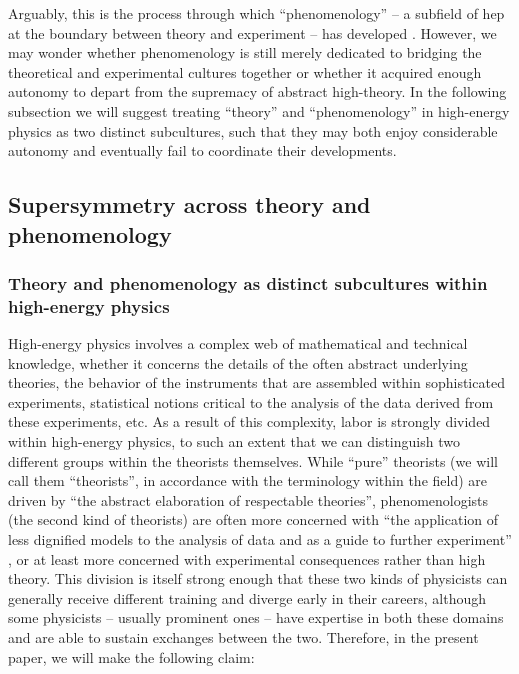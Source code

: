 \documentclass[smallextended]{svjour3}
\begin{document}
Arguably, this is the process through which ``phenomenology'' -- a subfield of \gls{hep} at the boundary between theory and experiment -- has developed \citep[p.~837]{galison1997image}. However, we may wonder whether phenomenology is still merely dedicated to bridging the theoretical and experimental cultures together or whether it acquired enough autonomy to depart from the supremacy of abstract high-theory. In the following subsection we will suggest treating ``theory'' and ``phenomenology'' in high-energy physics as two distinct subcultures, such that they may both enjoy considerable autonomy and eventually fail to coordinate their developments.

\subsection{Supersymmetry across theory and phenomenology}
\label{section:hep_susy}

\subsubsection{Theory and phenomenology as distinct subcultures within high-energy physics}

High-energy physics involves a complex web of mathematical and technical knowledge, whether it concerns the details of the often abstract underlying theories, the behavior of the instruments that are assembled within sophisticated experiments, statistical notions critical to the analysis of the data derived from these experiments, etc. As a result of this complexity, labor is strongly divided within high-energy physics, to such an extent that we can distinguish two different groups within the theorists themselves. 
While ``pure'' theorists (we will call them ``theorists'', in accordance with the terminology within the field) are driven by ``the abstract elaboration of respectable theories'', phenomenologists (the second kind of theorists) are often more concerned with ``the application of less dignified models to the analysis of data and as a
guide to further experiment'' \citep{pickering1984constructing}, or at least more concerned with experimental consequences rather than high theory. This division is itself strong enough that these two kinds of physicists can generally receive different training and diverge early in their careers, although some physicists -- usually prominent ones -- have expertise in both these domains and are able to sustain exchanges between the two. Therefore, in the present paper, we will make the following claim:
\end{document}
